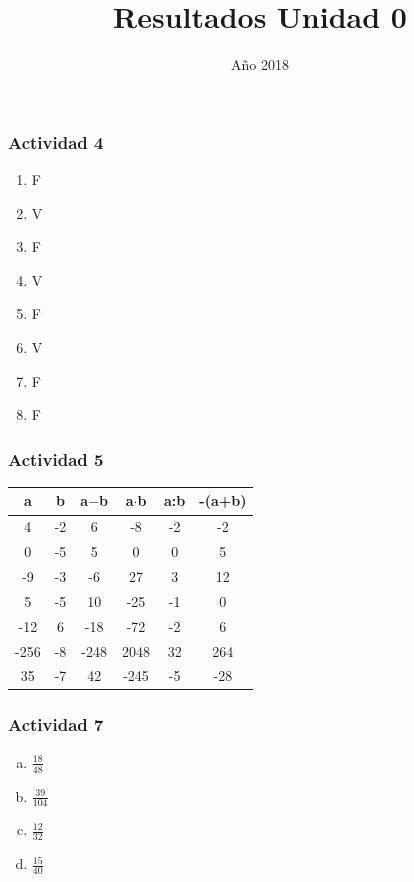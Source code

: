 \documentclass[a4paper, twocolumn]{article}
\title{Resultados Unidad 0}
\date{Año 2018}
\begin{document}
\maketitle
\subsubsection*{Actividad 4}
\begin{enumerate}[1)]
\item{F}
\item{V}
\item{F}
\item{V}
\item{F}
\item{V}
\item{F}
\item{F}
\end{enumerate}
\subsubsection*{Actividad 5}
\begin{table}[h]
\centering

\label{my-label}
\begin{tabular}{@{}cccccc@{}}
\toprule
a    & b  & a$-$b  & a$\cdot$b   & a:b & -(a+b) \\ \midrule
4    & -2 & 6    & -8   & -2  & -2     \\
0    & -5 & 5    & 0    & 0   & 5      \\
-9   & -3 & -6   & 27   & 3   & 12     \\
5    & -5 & 10    & -25  & -1  & 0      \\
-12  & 6  & -18  & -72  & -2  & 6      \\
-256 & -8 & -248 & 2048 & 32  & 264    \\
35   & -7 & 42   & -245 & -5  & -28   
\end{tabular}
\end{table}



\subsubsection*{Actividad 7}
\begin{enumerate}[a)]
\item $\frac{18}{48}$
\item $\frac{39}{104}$
\item $\frac{12}{32}$
\item $\frac{15}{40}$
\end{enumerate}
\end{document}
